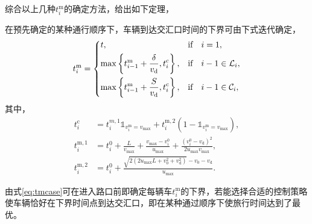 综合以上几种$t_i^\mathrm{m}$的确定方法，给出如下定理，
\begin{theorem}
在预先确定的某种通行顺序下，车辆到达交汇口时间的下界可由下式迭代确定，
\begin{equation}
t_i^\mathrm{m}=
\begin{dcases}
t, & \text{if}\quad i=1,\\
\max \left\{t_{i-1}^\mathrm{m} + \frac{\delta}{v_\mathrm{d}}, t_i^\mathrm{c}\right\}, & \text{if}\quad i-1\in \mathcal{L}_i,\\
\max \left\{t_{i-1}^\mathrm{m} + \frac{S}{v_\mathrm{d}}, t_i^\mathrm{c}\right\}, & \text{if}\quad i-1\in \mathcal{C}_i,
\end{dcases}
\label{eq:tmcase}
\end{equation}
其中，
\begin{align}
t_i^\mathrm{c}&=t_i^{m,1}\mathds{1}_{v_i^\mathrm{m}=v_{\max}}+t_i^\mathrm{m,2}(1-\mathds{1}_{v_i^\mathrm{m}=v_{\max}}),\\
t_i^\mathrm{m,1}&=t_i^0 + \frac{L}{v_{\max}} + \frac{v_{\max}-v_i^0}{u_{\max}} + \frac{(v_i^0-v_\mathrm{d})^2}{2u_{\max}v_{\max}},\\
t_i^\mathrm{m,2}&=t_i^0+\frac{\sqrt{2(2u_{\max}L+v_0^2+v_\mathrm{d}^2)}-v_0-v_\mathrm{d}}{u_{\max}}.
\end{align}
\end{theorem}

由式\ref{eq:tmcase}可在进入路口前即确定每辆车$t_i^\mathrm{m}$的下界，若能选择合适的控制策略使车辆恰好在下界时间点到达交汇口，即在某种通过顺序下使旅行时间达到了最优。

